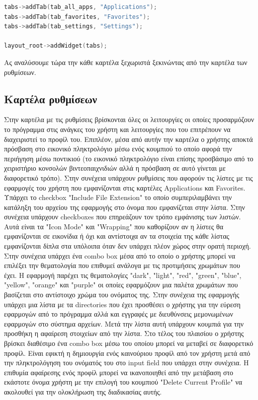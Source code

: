 \begin{lstlisting}[language=C++, style=cppstyle]
tabs->addTab(tab_all_apps, "Applications");
tabs->addTab(tab_favorites, "Favorites");
tabs->addTab(tab_settings, "Settings");

layout_root->addWidget(tabs);
\end{lstlisting}

Ας αναλύσουμε τώρα την κάθε καρτέλα ξεχωριστά ξεκινώντας από την καρτέλα των ρυθμίσεων.


\subsection{Καρτέλα ρυθμίσεων}

Στην καρτέλα με τις ρυθμίσεις βρίσκονται όλες οι λειτουργίες οι οποίες προσαρμόζουν το
πρόγραμμα στις ανάγκες του χρήστη και λειτουργίες που του επιτρέπουν να διαχειριστεί το
προφίλ του. Επιπλέον, μέσα από αυτήν την καρτέλα ο χρήστης αποκτά πρόσβαση στο εικονικό
πληκτρολόγιο μέσω ενός κουμπιού το οποίο αφορά την περιήγηση μέσω ποντικιού (το εικονικό
πληκτρολόγιο είναι επίσης προσβάσιμο από το χειριστήριο κονσολών βιντεοπαιχνιδιών αλλά η
πρόσβαση σε αυτό γίνεται με διαφορετικό τρόπο). Στην συνέχεια υπάρχουν ρυθμίσεις που αφορούν
τις λίστες με τις εφαρμογές του χρήστη που εμφανίζονται στις καρτέλες Applications και 
Favorites. Υπάρχει το checkbox "Include File Extension" το οποίο συμπεριλαμβάνει την κατάληξη
του αρχείου της εφαρμογής στο όνομα που εμφανίζεται στην λίστα. Στην συνέχεια υπάρχουν
checkboxes που επηρεάζουν τον τρόπο εμφάνισης των λιστών. Αυτά είναι τα "Icon Mode" και
"Wrapping" που καθορίζουν αν η λίστες θα εμφανίζονται σε εικονίδια ή όχι και αντίστοιχα αν τα στοιχεία
της κάθε λίστας εμφανίζονται δίπλα στα υπόλοιπα όταν δεν υπάρχει πλέον χώρος στην ορατή περιοχή.
Στην συνέχεια υπάρχει ένα combo box μέσα από το οποίο ο χρήστης μπορεί να επιλέξει την
θεματολογία που επιθυμεί ανάλογα με τις προτιμήσεις χρωμάτων που έχει. Η εφαρμογή παρέχει τις
θεματολογίες "dark", "light", "red", "green", "blue", "yellow", "orange" και "purple" οι οποίες
εφαρμόζουν μια παλέτα χρωμάτων που βασίζεται στο αντίστοιχο χρώμα του ονόματος της.  Στην συνέχεια
της εφαρμογής υπάρχει μια λίστα με τα directories που έχει προσθέσει ο χρήστης για την εύρεση εφαρμογών 
από το πρόγραμμα αλλά και εγγραφές με διευθύνσεις μεμονωμένων εφαρμογών στο σύστημα αρχείων.
Μετά την λίστα αυτή υπάρχουν κουμπιά για την προσθήκη η αφαίρεση στοιχείων από την λίστα.
Στο τέλος του πλαισίου ο χρήστης βρίσκει διαθέσιμο ένα combo box μέσω του οποίου μπορεί να μεταβεί σε διαφορετικό προφίλ.
Είναι εφικτή η δημιουργία ενός καινούριου προφίλ από τον χρήστη μετά από την πληκτρολόγηση του
ονόματός του στο input field που υπάρχει στην συνέχεια. Η επιθυμία αφαίρεσης ενός προφίλ μπορεί να
ικανοποιηθεί από την μετάβαση στο εκάστοτε όνομα χρήστη με την επιλογή του κουμπιού
"Delete Current Profile" να ακολουθεί για την ολοκλήρωση της διαδικασίας αυτής.

